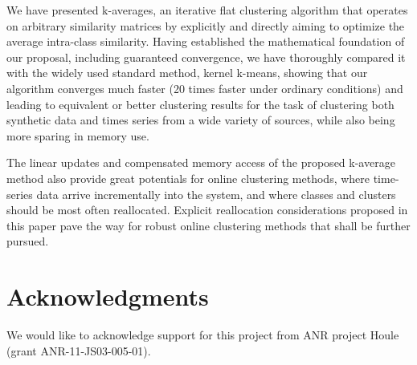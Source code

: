 \documentclass[natbib,smallextended]{svjour3}
\begin{document}
We have presented k-averages, an iterative flat clustering algorithm that operates on arbitrary similarity matrices by explicitly and directly aiming to optimize the average intra-class similarity. Having established the mathematical foundation of our proposal, including guaranteed convergence, we have thoroughly compared it with the widely used standard method, kernel k-means, showing that our algorithm converges much faster (20 times faster under ordinary conditions) and leading to equivalent or better clustering results for the task of clustering both synthetic data and times series from a wide variety of sources, while also being more sparing in memory use.

The linear updates and compensated memory access of the proposed k-average method also provide great potentials for online clustering methods, where time-series data arrive incrementally into the system, and where classes and clusters should be most often reallocated. Explicit reallocation considerations proposed in this paper pave the way for robust online clustering methods that shall be further pursued.



\section{Acknowledgments}
We would like to acknowledge support for this project
from ANR project Houle (grant ANR-11-JS03-005-01).







%
%
%
\end{document}
